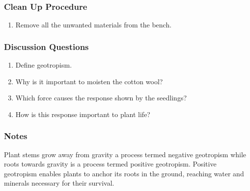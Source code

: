 \subsubsection*{Clean Up Procedure}
\begin{enumerate}
\item{Remove all the unwanted materials from the bench.}
\end{enumerate}

\subsubsection*{Discussion Questions}
\begin{enumerate}
\item{Define geotropism.}
\item{Why is it important to moisten the cotton wool?}
\item{Which force causes the response shown by the seedlings?}
\item{How is this response important to plant life?}
\end{enumerate}

\subsubsection*{Notes}
Plant stems grow away from gravity a process termed negative geotropism while roots towards gravity is a process termed positive geotropism.  Positive geotropism enables plants to anchor its roots in the ground, reaching water and minerals necessary for their survival.
